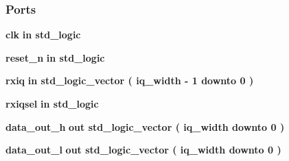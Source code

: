 \subsubsection*{Ports}
 \begin{DoxyCompactItemize}
\item 
{\bf clk}  {\bfseries {\bfseries \textcolor{keywordflow}{in}\textcolor{vhdlchar}{ }}} {\bfseries \textcolor{comment}{std\+\_\+logic}\textcolor{vhdlchar}{ }} 
\item 
{\bf reset\+\_\+n}  {\bfseries {\bfseries \textcolor{keywordflow}{in}\textcolor{vhdlchar}{ }}} {\bfseries \textcolor{comment}{std\+\_\+logic}\textcolor{vhdlchar}{ }} 
\item 
{\bf rxiq}  {\bfseries {\bfseries \textcolor{keywordflow}{in}\textcolor{vhdlchar}{ }}} {\bfseries \textcolor{comment}{std\+\_\+logic\+\_\+vector}\textcolor{vhdlchar}{ }\textcolor{vhdlchar}{(}\textcolor{vhdlchar}{ }\textcolor{vhdlchar}{ }\textcolor{vhdlchar}{ }\textcolor{vhdlchar}{ }{\bfseries {\bf iq\+\_\+width}} \textcolor{vhdlchar}{-\/}\textcolor{vhdlchar}{ } \textcolor{vhdldigit}{1} \textcolor{vhdlchar}{ }\textcolor{keywordflow}{downto}\textcolor{vhdlchar}{ }\textcolor{vhdlchar}{ } \textcolor{vhdldigit}{0} \textcolor{vhdlchar}{ }\textcolor{vhdlchar}{)}\textcolor{vhdlchar}{ }} 
\item 
{\bf rxiqsel}  {\bfseries {\bfseries \textcolor{keywordflow}{in}\textcolor{vhdlchar}{ }}} {\bfseries \textcolor{comment}{std\+\_\+logic}\textcolor{vhdlchar}{ }} 
\item 
{\bf data\+\_\+out\+\_\+h}  {\bfseries {\bfseries \textcolor{keywordflow}{out}\textcolor{vhdlchar}{ }}} {\bfseries \textcolor{comment}{std\+\_\+logic\+\_\+vector}\textcolor{vhdlchar}{ }\textcolor{vhdlchar}{(}\textcolor{vhdlchar}{ }\textcolor{vhdlchar}{ }\textcolor{vhdlchar}{ }\textcolor{vhdlchar}{ }{\bfseries {\bf iq\+\_\+width}} \textcolor{vhdlchar}{ }\textcolor{keywordflow}{downto}\textcolor{vhdlchar}{ }\textcolor{vhdlchar}{ } \textcolor{vhdldigit}{0} \textcolor{vhdlchar}{ }\textcolor{vhdlchar}{)}\textcolor{vhdlchar}{ }} 
\item 
{\bf data\+\_\+out\+\_\+l}  {\bfseries {\bfseries \textcolor{keywordflow}{out}\textcolor{vhdlchar}{ }}} {\bfseries \textcolor{comment}{std\+\_\+logic\+\_\+vector}\textcolor{vhdlchar}{ }\textcolor{vhdlchar}{(}\textcolor{vhdlchar}{ }\textcolor{vhdlchar}{ }\textcolor{vhdlchar}{ }\textcolor{vhdlchar}{ }{\bfseries {\bf iq\+\_\+width}} \textcolor{vhdlchar}{ }\textcolor{keywordflow}{downto}\textcolor{vhdlchar}{ }\textcolor{vhdlchar}{ } \textcolor{vhdldigit}{0} \textcolor{vhdlchar}{ }\textcolor{vhdlchar}{)}\textcolor{vhdlchar}{ }} 
\end{DoxyCompactItemize}


